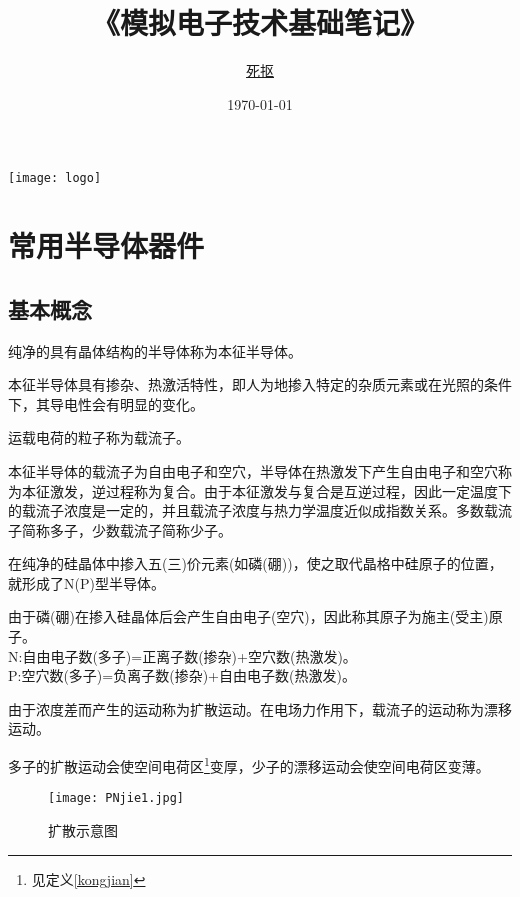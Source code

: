 \documentclass[cn,pad,11pt,geye]{elegantnote}
\title{\ttfamily《模拟电子技术基础笔记》}
\author{\href{https://github.com/sikouhjw}{死抠}}
\date{\today}
\begin{document}
\maketitle
\centerline{\texttt{[image: logo]}}


\section{常用半导体器件}
\subsection{基本概念}
\begin{definition}[本征半导体]
	纯净的具有晶体结构的半导体称为本征半导体。
\end{definition}
\begin{note}
	本征半导体具有掺杂、热激活特性，即人为地掺入特定的杂质元素或在光照的条件下，其导电性会有明显的变化。
\end{note}
\begin{definition}[载流子]
	运载电荷的粒子称为载流子。
\end{definition}
\begin{note}
	本征半导体的载流子为自由电子和空穴，半导体在热激发下产生自由电子和空穴称为本征激发，逆过程称为复合。由于本征激发与复合是互逆过程，因此一定温度下的载流子浓度是一定的，并且载流子浓度与热力学温度近似成指数关系。多数载流子简称多子，少数载流子简称少子。
\end{note}
\begin{definition}[N(P)型半导体]
	在纯净的硅晶体中掺入五(三)价元素(如磷(硼))，使之取代晶格中硅原子的位置，就形成了N(P)型半导体。
\end{definition}
\begin{note}
	由于磷(硼)在掺入硅晶体后会产生自由电子(空穴)，因此称其原子为施主(受主)原子。\\
	N:自由电子数(多子)=正离子数(掺杂)+空穴数(热激发)。\\
	P:空穴数(多子)=负离子数(掺杂)+自由电子数(热激发)。
\end{note}
\begin{definition}
	由于浓度差而产生的运动称为扩散运动。在电场力作用下，载流子的运动称为漂移运动。
\end{definition}
\begin{note}
	多子的扩散运动会使空间电荷区\footnote{见定义\ref{kongjian}}变厚，少子的漂移运动会使空间电荷区变薄。
\end{note}
\begin{figure}[h]
	\centering
	\texttt{[image: PNjie1.jpg]}
	\caption{扩散示意图}
\end{figure}
\end{document}
